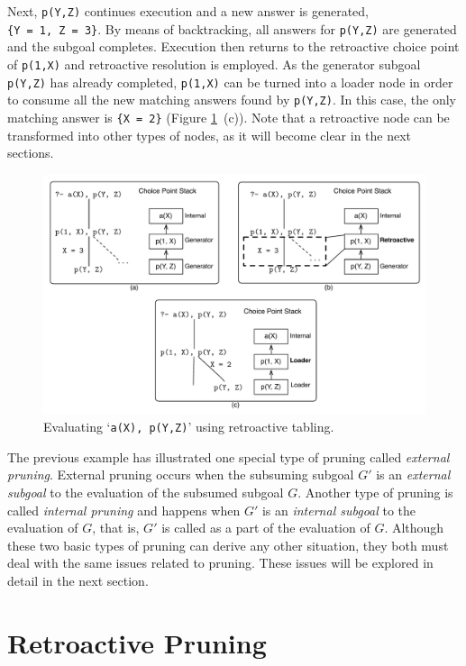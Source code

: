 Next, \texttt{p(Y,Z)} continues execution and a new answer is generated, \texttt{\{Y~=~1,~Z~=~3\}}.
By means of backtracking, all answers for \texttt{p(Y,Z)} are generated and the subgoal completes.
Execution then returns to the retroactive choice point of \texttt{p(1,X)} and retroactive resolution is employed.
As the generator subgoal \texttt{p(Y,Z)} has already completed, \texttt{p(1,X)} can be turned into a loader
node in order to consume all the new matching answers found by \texttt{p(Y,Z)}.
In this case, the only matching answer is \texttt{\{X~=~2\}} (Figure \ref{fig:retro_eval1}~(c)).
Note that a retroactive node can be transformed into other types of nodes, as it will become clear in the next
sections.

\begin{figure}[ht]
  \centering
    \includegraphics[scale=0.6]{pruning_example1.pdf}
  \caption{Evaluating `\texttt{a(X),~p(Y,Z)}' using retroactive tabling.}
  \label{fig:retro_eval1}
\end{figure}

The previous example has illustrated one special type of pruning called \textit{external pruning}.
External pruning occurs when the subsuming subgoal $G'$ is an \textit{external subgoal} to the evaluation
of the subsumed subgoal $G$. Another type of pruning is called \textit{internal pruning} and happens
when $G'$ is an \textit{internal subgoal} to the evaluation of $G$, that is, $G'$ is called
as a part of the evaluation of $G$. Although these two basic types of pruning can derive any other
situation, they both must deal with the same issues related to pruning. These issues will be explored
in detail in the next section.

\section{Retroactive Pruning}

